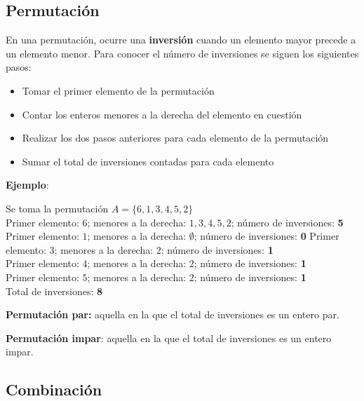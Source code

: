\subsection*{Permutación}

En una permutación, ocurre una \textbf{inversi\'on} cuando un elemento mayor
precede a un elemento menor. Para conocer el n\'umero de inversiones se siguen
los siguientes pasos:

\begin{itemize}
\item Tomar el primer elemento de la permutaci\'on
\item Contar los enteros menores a la derecha del elemento en cuesti\'on
\item Realizar los dos pasos anteriores para cada elemento de la permutaci\'on
\item Sumar el total de inversiones contadas para cada elemento
\end{itemize}

\textbf{Ejemplo}:

Se toma la permutación \textbf{$A=\{6,1,3,4,5,2\}$}\\

Primer elemento: $6$; menores a la derecha: $1,3,4,5,2$; n\'umero de
inversiones: \textbf{5}
Primer elemento: $1$; menores a la derecha: $\emptyset$; n\'umero de
inversiones: \textbf{0}
Primer elemento: $3$; menores a la derecha: $2$; n\'umero de inversiones:
\textbf{1}\\
Primer elemento: $4$; menores a la derecha: $2$; n\'umero de inversiones:
\textbf{1}\\
Primer elemento: $5$; menores a la derecha: $2$; n\'umero de inversiones:
\textbf{1}\\

Total de inversiones: \textbf{8}
\begin{tcolorbox}[colback=blue!5!white,colframe=blue!60!black,title=Definición: Tipos de permutaciones]
	\textbf{Permutaci\'on par:} aquella en la que el total de inversiones es un
	entero par.
	
	\tcblower

	\textbf{Permutaci\'on impar}: aquella en la que el total de inversiones es un
	entero impar.
	
\end{tcolorbox}

\subsection*{Combinación}

